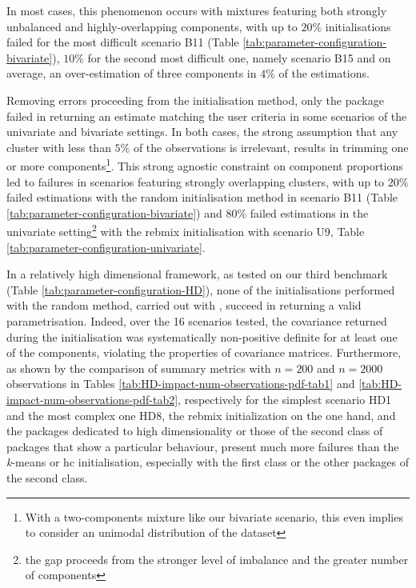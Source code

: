 In most cases, this phenomenon occurs with mixtures featuring both strongly unbalanced and highly-overlapping components, with up to \(20\%\) initialisations failed for the most difficult scenario B11 (Table \ref{tab:parameter-configuration-bivariate}), \(10\%\) for the second most difficult one, namely scenario B15 and on average, an over-estimation of three components in \(4\%\) of the estimations.

Removing errors proceeding from the initialisation method, only the  package failed in returning an estimate matching the user criteria in some scenarios of the univariate and bivariate settings. In both cases, the strong assumption that any cluster with less than \(5\%\) of the observations is irrelevant, results in trimming one or more components\footnote{With a two-components mixture like our bivariate scenario, this even implies to consider an unimodal distribution of the dataset}. This strong agnostic constraint on component proportions led to failures in scenarios featuring strongly overlapping clusters, with up to \(20\%\) failed estimations with the random initialisation method in scenario B11 (Table \ref{tab:parameter-configuration-bivariate}) and \(80\%\) failed estimations in the univariate setting\footnote{the gap proceeds from the stronger level of imbalance and the greater number of components} with the rebmix initialisation with scenario U9, Table \ref{tab:parameter-configuration-univariate}.

\color{blue}

In a relatively high dimensional framework, as tested on our third benchmark (Table \ref{tab:parameter-configuration-HD}), none of the initialisations performed with the random method, carried out with , succeed in returning a valid parametrisation. Indeed, over the 16 scenarios tested, the covariance returned during the initialisation was systematically non-positive definite for at least one of the components, violating the properties of covariance matrices.
Furthermore, as shown by the comparison of summary metrics with \(n=200\) and \(n=2000\) observations in Tables \ref{tab:HD-impact-num-observations-pdf-tab1}
and \ref{tab:HD-impact-num-observations-pdf-tab2}, respectively for the simplest scenario HD1 and the most complex one HD8, the rebmix initialization on the one hand, and the packages dedicated to high dimensionality or those of the second class of packages that show a particular behaviour, present much more failures than the \emph{k}-means or hc initialisation, especially with the first class or the other packages of the second class.
\color{black}

